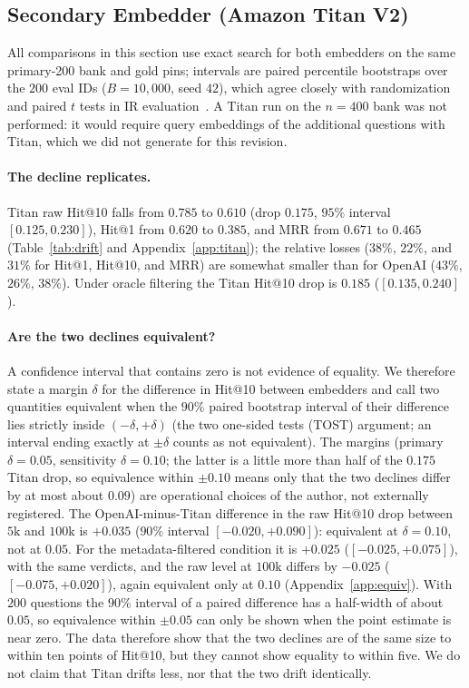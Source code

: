 \documentclass{ieeeaccess}
\makeatletter
\DeclareRobustCommand{\_}{\ifmmode\nfss@text{\textunderscore}\else\textunderscore\allowbreak\fi}
\makeatother
\begin{document}



\subsection{Secondary Embedder (Amazon Titan V2)}
\label{sec:titan}
All comparisons in this section use exact search for both embedders on the same primary-200 bank and gold pins; intervals are paired percentile bootstraps over the $200$ eval IDs ($B{=}10{,}000$, seed $42$), which agree closely with randomization and paired $t$ tests in IR evaluation~\cite{smucker2007significance}. A Titan run on the $n{=}400$ bank was not performed: it would require query embeddings of the additional questions with Titan, which we did not generate for this revision.

\paragraph{The decline replicates.}
Titan raw Hit@10 falls from $0.785$ to $0.610$ (drop $0.175$, $95\%$ interval $[0.125,0.230]$), Hit@1 from $0.620$ to $0.385$, and MRR from $0.671$ to $0.465$ (Table~\ref{tab:drift} and Appendix~\ref{app:titan}); the relative losses ($38\%$, $22\%$, and $31\%$ for Hit@1, Hit@10, and MRR) are somewhat smaller than for OpenAI ($43\%$, $26\%$, $38\%$). Under oracle filtering the Titan Hit@10 drop is $0.185$ ($[0.135,0.240]$).

\paragraph{Are the two declines equivalent?}
A confidence interval that contains zero is not evidence of equality. We therefore state a margin $\delta$ for the difference in Hit@10 between embedders and call two quantities equivalent when the $90\%$ paired bootstrap interval of their difference lies strictly inside $(-\delta,+\delta)$ (the two one-sided tests (TOST) argument; an interval ending exactly at $\pm\delta$ counts as not equivalent). The margins (primary $\delta{=}0.05$, sensitivity $\delta{=}0.10$; the latter is a little more than half of the $0.175$ Titan drop, so equivalence within $\pm0.10$ means only that the two declines differ by at most about $0.09$) are operational choices of the author, not externally registered. The OpenAI-minus-Titan difference in the raw Hit@10 drop between $5\text{k}$ and $100\text{k}$ is $+0.035$ ($90\%$ interval $[-0.020,+0.090]$): equivalent at $\delta{=}0.10$, not at $0.05$. For the metadata-filtered condition it is $+0.025$ ($[-0.025,+0.075]$), with the same verdicts, and the raw level at $100\text{k}$ differs by $-0.025$ ($[-0.075,+0.020]$), again equivalent only at $0.10$ (Appendix~\ref{app:equiv}). With $200$ questions the $90\%$ interval of a paired difference has a half-width of about $0.05$, so equivalence within $\pm0.05$ can only be shown when the point estimate is near zero. The data therefore show that the two declines are of the same size to within ten points of Hit@10, but they cannot show equality to within five. We do not claim that Titan drifts less, nor that the two drift identically.
\end{document}
